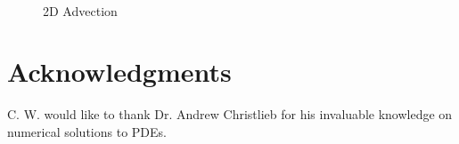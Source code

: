\documentclass{article}
\begin{document}
\begin{figure}[p]
\centering
{}\\
\vfill
{}
\caption{2D Advection} 
\end{figure}

\section{Acknowledgments}

C. W. would like to thank Dr. Andrew Christlieb for his invaluable knowledge on numerical solutions to PDEs.







  

\end{document}
